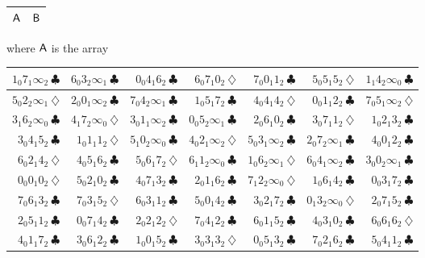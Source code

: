 \documentclass[draft, 11pt]{article}
\begin{document}
 
  \begin{figure}[t!]
  \renewcommand{\arraystretch}{2}
 \setlength{\tabcolsep}{10pt} \centering \Large
\begin{tabular}{|c|c|}
\hline 
${\sf A}$ & ${\sf B}$\\
\hline
\end{tabular}

\vskip 5pt
\normalsize \flushleft where ${\sf A}$ is the array
\vskip 5pt

\renewcommand{\arraystretch}{1.2}
 \setlength\tabcolsep{1pt}
 \centering
\begin{tabular}{|r|r|r| r|r|r|r| }
\hline
$1_0 7_1 \infty_2 ~ \clubsuit$ &
$6_0 3_2 \infty_1 ~ \clubsuit$ &
$0_0 4_1 6_2 ~ \clubsuit$ &
$6_0 7_1 0_2 ~ \diamondsuit$ &
$7_0 0_1 1_2 ~ \clubsuit$ &
$5_0 5_1 5_2 ~ \diamondsuit$ &
$1_1 4_2 \infty_0 ~ \clubsuit$ \\\hline
$5_0 2_2 \infty_1 ~ \diamondsuit$ &
$2_0 0_1 \infty_2 ~ \clubsuit$ &
$7_0 4_2 \infty_1 ~ \clubsuit$ &
$1_0 5_1 7_2 ~ \clubsuit$ &
$4_0 4_1 4_2 ~ \diamondsuit$ &
$0_0 1_1 2_2 ~ \clubsuit$ &
$7_0 5_1 \infty_2 ~ \diamondsuit$ \\\hline
$3_1 6_2 \infty_0 ~ \clubsuit$ &
$4_1 7_2 \infty_0 ~ \diamondsuit$ &
$3_0 1_1 \infty_2 ~ \clubsuit$ &
$0_0 5_2 \infty_1 ~ \clubsuit$ &
$2_0 6_1 0_2 ~ \clubsuit$ &
$3_0 7_1 1_2 ~ \diamondsuit$ &
$1_0 2_1 3_2 ~ \clubsuit$ \\\hline
$3_0 4_1 5_2 ~ \clubsuit$ &
$1_0 1_1 1_2 ~ \diamondsuit$ &
$5_1 0_2 \infty_0 ~ \clubsuit$ &
$4_0 2_1 \infty_2 ~ \diamondsuit$ &
$5_0 3_1 \infty_2 ~ \clubsuit$ &
$2_0 7_2 \infty_1 ~ \clubsuit$ &
$4_0 0_1 2_2 ~ \clubsuit$ \\\hline
$6_0 2_1 4_2 ~ \diamondsuit$ &
$4_0 5_1 6_2 ~ \clubsuit$ &
$5_0 6_1 7_2 ~ \diamondsuit$ &
$6_1 1_2 \infty_0 ~ \clubsuit$ &
$1_0 6_2 \infty_1 ~ \diamondsuit$ &
$6_0 4_1 \infty_2 ~ \clubsuit$ &
$3_0 0_2 \infty_1 ~ \clubsuit$ \\\hline
$0_0 0_1 0_2 ~ \diamondsuit$ &
$5_0 2_1 0_2 ~ \clubsuit$ &
$4_0 7_1 3_2 ~ \clubsuit$ &
$2_0 1_1 6_2 ~ \clubsuit$ &
$7_1 2_2 \infty_0 ~ \diamondsuit$ &
$1_0 6_1 4_2 ~ \clubsuit$ &
$0_0 3_1 7_2 ~ \clubsuit$ \\\hline
$7_0 6_1 3_2 ~ \clubsuit$ &
$7_0 3_1 5_2 ~ \diamondsuit$ &
$6_0 3_1 1_2 ~ \clubsuit$ &
$5_0 0_1 4_2 ~ \clubsuit$ &
$3_0 2_1 7_2 ~ \clubsuit$ &
$0_1 3_2 \infty_0 ~ \diamondsuit$ &
$2_0 7_1 5_2 ~ \clubsuit$ \\\hline
$2_0 5_1 1_2 ~ \clubsuit$ &
$0_0 7_1 4_2 ~ \clubsuit$ &
$2_0 2_1 2_2 ~ \diamondsuit$ &
$7_0 4_1 2_2 ~ \clubsuit$ &
$6_0 1_1 5_2 ~ \clubsuit$ &
$4_0 3_1 0_2 ~ \clubsuit$ &
$6_0 6_1 6_2 ~ \diamondsuit$ \\\hline
$4_0 1_1 7_2 ~ \clubsuit$ &
$3_0 6_1 2_2 ~ \clubsuit$ &
$1_0 0_1 5_2 ~ \clubsuit$ &
$3_0 3_1 3_2 ~ \diamondsuit$ &
$0_0 5_1 3_2 ~ \clubsuit$ &
$7_0 2_1 6_2 ~ \clubsuit$ &
$5_0 4_1 1_2 ~ \clubsuit$ \\\hline
\end{tabular}


\end{figure}
\end{document}
